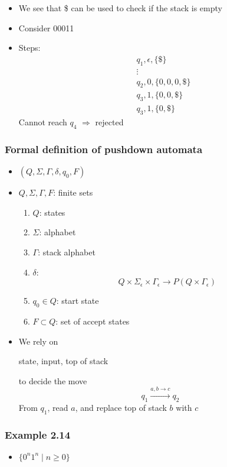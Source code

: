 \begin{frame}[allowframebreaks]
\begin{itemize}
\item We see that \$ can be used to check
  if the stack is empty

\item Consider 00011
\item [] Steps:
  \begin{equation*}
    \begin{split}
& q_1, \epsilon, \{\$\} \\
& \vdots \\
& q_2, 0, \{0, 0,0,\$\}\\
& q_3, 1, \{0, 0, \$\}\\
& q_3, 1, \{0, \$\}
\end{split}
\end{equation*}
Cannot reach $q_4$ $\Rightarrow$ rejected  
\end{itemize}\end{frame} \begin{frame}[allowframebreaks] \frametitle{Formal definition of pushdown automata}
  \begin{itemize}  
\item $(Q,\Sigma, \Gamma, \delta, q_0, F)$

\item [] $Q, \Sigma, \Gamma, F$: finite sets
\begin{enumerate}
\item $Q$: states
\item $\Sigma$: alphabet
\item $\Gamma$: stack alphabet
\item $\delta$:
  \begin{equation*}
  Q \times 
\Sigma_{\epsilon} \times \Gamma_{\epsilon}
\rightarrow P(Q\times \Gamma_\epsilon)
\end{equation*}
\item $q_0 \in Q$: start state
\item $F \subset Q$: set of accept states
\end{enumerate}
\item We rely on
  \begin{center}
  state, input, \alert{top of stack}
\end{center}
to decide the move
\begin{equation*}
q_1 \stackrel{a,b \rightarrow c}{\longrightarrow}
q_2
\end{equation*}
From $q_1$, read $a$, and replace top of stack
$b$ with $c$
\end{itemize}\end{frame} \begin{frame}[allowframebreaks] \frametitle{Example 2.14}
  \begin{itemize}
\item $\{0^n 1^n\mid n \geq 0\}$


\end{itemize}
\end{frame}
